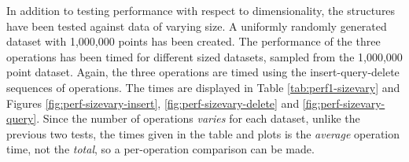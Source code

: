 In addition to testing performance with respect to dimensionality, the structures have been tested against data of varying size. A uniformly randomly generated dataset with 1,000,000 points has been created. The performance of the three operations has been timed for different sized datasets, sampled from the 1,000,000 point dataset. Again, the three operations are timed using the insert-query-delete sequences of operations. The times are displayed in Table \ref{tab:perf1-sizevary} and Figures \ref{fig:perf-sizevary-insert}, \ref{fig:perf-sizevary-delete} and \ref{fig:perf-sizevary-query}. Since the number of operations \textit{varies} for each dataset, unlike the previous two tests, the times given in the table and plots is the \textit{average} operation time, not the \textit{total}, so a per-operation comparison can be made.

